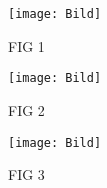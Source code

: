 \documentclass[11pt]{scrartcl}
\begin{document}
\begin{wrapfigure}[11]{l}{0.4\textwidth}
  \centering  
  \texttt{[image: Bild]}
  \caption{FIG 1}
\end{wrapfigure}
\blindtext

\begin{wrapfigure}[11]{r}{0.4\textwidth}
  \centering  
  \texttt{[image: Bild]}
  \caption{FIG 2}
\end{wrapfigure}
\blindtext

\begin{wrapfigure}[11]{l}{0.4\textwidth}
  \centering  
  \texttt{[image: Bild]}
  \caption{FIG 3}
\end{wrapfigure}
\blindtext 
\blindtext 
\end{document}
